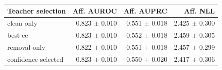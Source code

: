 \begin{tabular}{lrrr}
\toprule
Teacher selection & Aff. AUROC & Aff. AUPRC & Aff. NLL \\
\midrule
clean only & 0.823 $\pm$ 0.010 & 0.551 $\pm$ 0.018 & 2.425 $\pm$ 0.300 \\
best ce & 0.823 $\pm$ 0.010 & 0.552 $\pm$ 0.018 & 2.459 $\pm$ 0.305 \\
removal only & 0.822 $\pm$ 0.010 & 0.551 $\pm$ 0.018 & 2.457 $\pm$ 0.299 \\
confidence selected & 0.823 $\pm$ 0.010 & 0.550 $\pm$ 0.020 & 2.417 $\pm$ 0.306 \\
\bottomrule
\end{tabular}